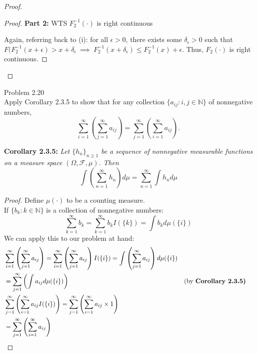 \documentclass[12pt,letterpaper, onecolumn]{exam}
\newcommand{\nat}{\mathbb{N}}
\newcommand{\calF}{\mathcal{F}}
\newcommand{\cutesum}[1]{\sum_{#1 = 1}^\infty}
\newcommand{\lp}{\left (}
\newcommand{\rp}{\right )}
\begin{document}
\begin{questions}
\begin{solution}
\begin{proof}
\begin{proof}
            \textbf{Part 2:} WTS $F_2^{-1}(\cdot)$ is right continuous

            Again, referring back to (i): for all $\epsilon > 0$, there exists some $\delta_\epsilon > 0$ such that $F(F^{-1}_2(x + \epsilon) > x + \delta_\epsilon \: \implies \: F_2^{-1}(x + \delta_\epsilon) \leq F_2^{-1}(x) + \epsilon$. Thus, $F_2(\cdot)$ is right continuous. 
        \end{proof}
    \end{proof}
    \end{solution}

    \question Problem 2.20 \\
    Apply Corollary 2.3.5 to show that for any collection $\{a_{ij}: i, j \in \nat\}$ of nonnegative numbers, 
    \[\sum_{i = 1}^\infty \left (\sum_{j = 1}^\infty a_{ij}\right) = \sum_{j = 1}^\infty \left(\sum_{i = 1}^\infty a_{ij}\right).  \]

    \textbf{Corollary 2.3.5:}
    \textit{Let $\{h_n\}_{n \geq 1}$ be a sequence of nonnegative measurable functions on a measure space $(\Omega, \calF, \mu)$. Then}
    \[\int\left(\sum_{n = 1}^\infty h_n\right) d\mu = \sum_{n = 1}^\infty \int h_n d\mu\]
    \begin{solution}
    \begin{proof}
    Define $\mu(\cdot)$ to be a counting measure. \\
    If $\{b_k: k \in \nat\}$ is a collection of nonnegative numbers:
    \[\cutesum{k}b_k = \cutesum{k} b_k I(\{k\}) = \int b_k d \mu(\{i\})\]
    We can apply this to our problem at hand:
    \begin{align*}
        & \cutesum{i}\left(\cutesum{j} a_{ij}\right) = \cutesum{i}\lp \cutesum{j} a_{ij}\rp I(\{i\}) = \int \lp \cutesum{j} a_{ij}\rp d\mu(\{i\}) \\
        & = \cutesum{j} \lp \int a_{ij} d \mu(\{i\}) \rp && \textrm{(by \textbf{Corollary 2.3.5)}} \\
        & \cutesum{j}\lp \cutesum{i} a_{ij} I(\{i\}) \rp = \cutesum{j} \lp \cutesum{i} a_{ij} \times 1 \rp \\
        & = \cutesum{j} \lp \cutesum{i} a_{ij} \rp
    \end{align*}
    \end{proof}
    \end{solution}


\end{questions}
\end{document}
